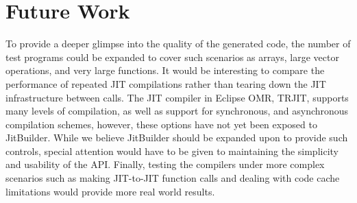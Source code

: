 \section{Future Work}
\label{sec:future-work}
To provide a deeper glimpse into the quality of the generated code, the number of test programs could be expanded to cover such scenarios as arrays, large vector operations, and very large functions.
It would be interesting to compare the performance of repeated JIT compilations rather than tearing down the JIT infrastructure between calls.
The JIT compiler in Eclipse OMR, TRJIT, supports many levels of compilation, as well as support for synchronous, and asynchronous compilation schemes, however, these options have not yet been exposed to JitBuilder.
While we believe JitBuilder should be expanded upon to provide such controls, special attention would have to be given to maintaining the simplicity and usability of the API.
Finally, testing the compilers under more complex scenarios such as making JIT-to-JIT function calls and dealing with code cache limitations would provide more real world results.